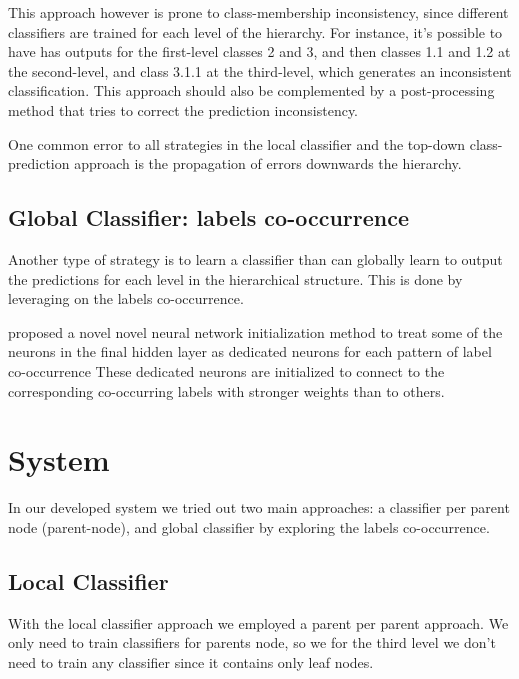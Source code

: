 \documentclass[11pt,a4paper]{article}
\begin{document}
This approach however is prone to class-membership inconsistency, since different classifiers are
trained for each level of the hierarchy. For instance, it's possible to have has outputs for the
first-level classes 2 and 3, and then classes 1.1 and 1.2 at the second-level, and class 3.1.1
at the third-level, which generates an inconsistent classification. This approach should also
be complemented by a post-processing method that tries to correct the prediction inconsistency.

One common error to all strategies in the local classifier and the top-down class-prediction
approach is the propagation of errors downwards the hierarchy.



\subsection{Global Classifier: labels co-occurrence}

Another type of strategy is to learn a classifier than can globally learn to output the predictions for each level
in the hierarchical structure. This is done by leveraging on the labels co-occurrence.

\citet*{kurata-etal-2016-improved} proposed a novel novel neural network initialization method to treat some of the neurons in the final hidden layer as dedicated neurons for each pattern of label co-occurrence These dedicated neurons are initialized to connect to the corresponding co-occurring labels with stronger weights than to others.








\section{System}\label{system}

In our developed system we tried out two main approaches: a classifier per
parent node (parent-node), and global classifier by exploring the
labels co-occurrence.



\subsection{Local Classifier}

With the local classifier approach we employed a parent per parent approach. We
only need to train classifiers for parents node, so we for the third level we
don't need to train any classifier since it contains only leaf nodes.
\end{document}
